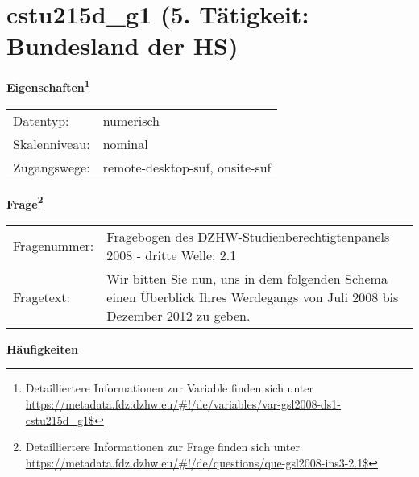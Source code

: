 
    \setcounter{footnote}{0}

    \vspace*{-1.8cm}
	\section{cstu215d\_g1 (5. Tätigkeit: Bundesland der HS)}
	\label{section:cstu215d_g1}



    \vspace*{0.5cm}
    \noindent\textbf{Eigenschaften\footnote{Detailliertere Informationen zur Variable finden sich unter
		\url{https://metadata.fdz.dzhw.eu/\#!/de/variables/var-gsl2008-ds1-cstu215d_g1$}}}\\
	\begin{tabularx}{\hsize}{@{}lX}
	Datentyp: & numerisch \\
	Skalenniveau: & nominal \\
	Zugangswege: &
	  remote-desktop-suf, 
	  onsite-suf
 \\
    \end{tabularx}



				\vspace*{0.5cm}
                \noindent\textbf{Frage\footnote{Detailliertere Informationen zur Frage finden sich unter
		              \url{https://metadata.fdz.dzhw.eu/\#!/de/questions/que-gsl2008-ins3-2.1$}}}\\
				\begin{tabularx}{\hsize}{@{}lX}
					Fragenummer: &
					  Fragebogen des DZHW-Studienberechtigtenpanels 2008 - dritte Welle:
					  2.1
 \\
					Fragetext: & Wir bitten Sie nun, uns in dem folgenden Schema einen Überblick Ihres Werdegangs von Juli 2008 bis Dezember 2012 zu geben. \\
				\end{tabularx}





        		\vspace*{0.5cm}
                \noindent\textbf{Häufigkeiten}


